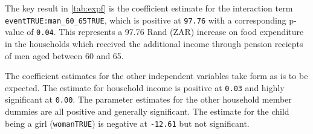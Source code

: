 \documentclass[a4paper,british]{article}\usepackage[]{graphicx}\usepackage[]{color}
\newcommand{\code}[1]{\texttt{#1}}
\let\ref\autoref
\begin{document}
The key result in \ref{tab:expf} is the coefficient estimate for
the interaction term \code{eventTRUE:man\_60\_65TRUE}, which is positive
at \code{97.76} with a corresponding p-value of \code{0.04}. This
represents a 97.76 Rand (ZAR) increase on food expenditure in the
households which received the additional income through pension reciepts
of men aged between 60 and 65.

The coefficient estimates for the other independent variables take
form as is to be expected. The estimate for household income is positive
at \code{0.03} and highly significant at \code{0.00}. The parameter
estimates for the other household member dummies are all positive
and generally significant. The estimate for the child being a girl
(\code{womanTRUE}) is negative at \code{-12.61} but not significant.
\end{document}

